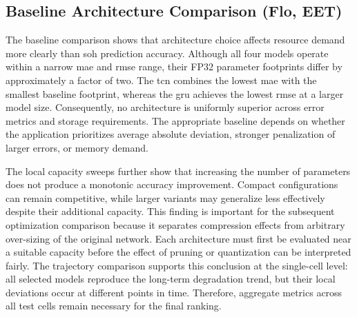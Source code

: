 \documentclass[final,3p,times]{elsarticle}
\begin{document}
\subsection{Baseline Architecture Comparison (Flo, EET)}
The baseline comparison shows that architecture choice affects resource demand more clearly than \ac{soh} prediction accuracy. Although all four models operate within a narrow \ac{mae} and \ac{rmse} range, their FP32 parameter footprints differ by approximately a factor of two. The \ac{tcn} combines the lowest \ac{mae} with the smallest baseline footprint, whereas the \ac{gru} achieves the lowest \ac{rmse} at a larger model size. Consequently, no architecture is uniformly superior across error metrics and storage requirements. The appropriate baseline depends on whether the application prioritizes average absolute deviation, stronger penalization of larger errors, or memory demand.

The local capacity sweeps further show that increasing the number of parameters does not produce a monotonic accuracy improvement. Compact configurations can remain competitive, while larger variants may generalize less effectively despite their additional capacity. This finding is important for the subsequent optimization comparison because it separates compression effects from arbitrary over-sizing of the original network. Each architecture must first be evaluated near a suitable capacity before the effect of pruning or quantization can be interpreted fairly. The trajectory comparison supports this conclusion at the single-cell level: all selected models reproduce the long-term degradation trend, but their local deviations occur at different points in time. Therefore, aggregate metrics across all test cells remain necessary for the final ranking.

\end{document}
